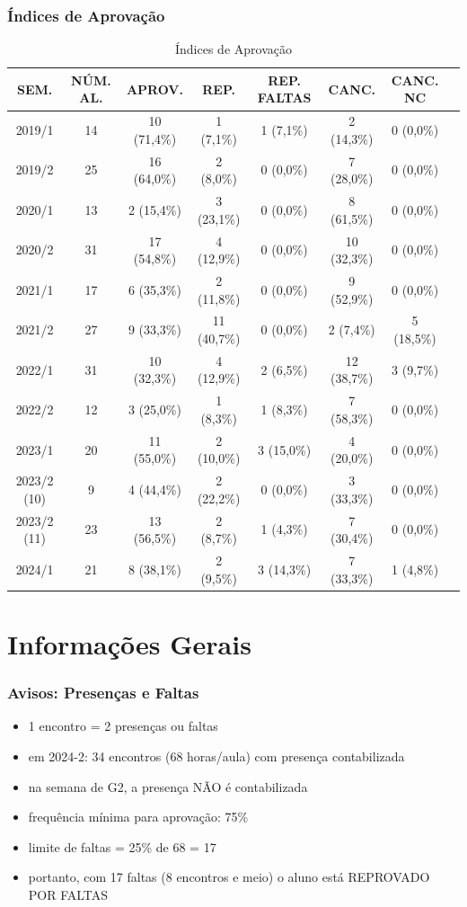 \documentclass[aspectratio=169]{beamer}
\begin{document}
\begin{frame}\frametitle{\'Indices de Aprova\c{c}\~ao}
	\begin{table}
		\centering
		\small
		\begin{tabular}{cccccccc}
			\toprule
			SEM. & N\'UM. AL. & APROV. & REP. & REP. FALTAS & CANC. & CANC. NC\\
			\midrule
			2019/1 & 14 & 10 (71,4\%) & 1 (7,1\%) & 1 (7,1\%) & 2 (14,3\%)& 0 (0,0\%)\\
			2019/2 & 25 & 16 (64,0\%) & 2 (8,0\%) & 0 (0,0\%) & 7 (28,0\%)& 0 (0,0\%)\\
			2020/1 & 13 & 2 (15,4\%) & 3 (23,1\%) & 0 (0,0\%) & 8 (61,5\%)& 0 (0,0\%)\\
			2020/2 & 31 & 17 (54,8\%) & 4 (12,9\%) & 0 (0,0\%) & 10 (32,3\%)& 0 (0,0\%)\\
			2021/1 & 17 & 6 (35,3\%) & 2 (11,8\%) & 0 (0,0\%) & 9 (52,9\%)& 0 (0,0\%)\\
			2021/2 & 27 & 9 (33,3\%) & 11 (40,7\%) & 0 (0,0\%) & 2 (7,4\%)& 5 (18,5\%)\\
			2022/1 & 31 & 10 (32,3\%) & 4 (12,9\%) & 2 (6,5\%) & 12 (38,7\%)& 3 (9,7\%)\\
			2022/2 & 12 & 3 (25,0\%) & 1 (8,3\%) & 1 (8,3\%) & 7 (58,3\%)& 0 (0,0\%)\\
			2023/1 & 20 & 11 (55,0\%) & 2 (10,0\%) & 3 (15,0\%) & 4 (20,0\%)& 0 (0,0\%)\\
			2023/2 (10) & 9 & 4 (44,4\%) & 2 (22,2\%) & 0 (0,0\%) & 3 (33,3\%) & 0 (0,0\%)\\
			2023/2 (11) & 23 & 13 (56,5\%) & 2 (8,7\%) & 1 (4,3\%) & 7 (30,4\%) & 0 (0,0\%)\\
			2024/1 & 21 & 8 (38,1\%) & 2 (9,5\%) & 3 (14,3\%) & 7 (33,3\%) & 1 (4,8\%)\\
			\bottomrule
		\end{tabular}
		\caption{\'Indices de Aprova\c{c}\~ao}
	\end{table}
\end{frame}

\section{Informa\c{c}\~oes Gerais}

\begin{frame}\frametitle{Avisos: Presenças e Faltas}
\begin{itemize}
	\item 1 encontro = 2 presen\c{c}as ou faltas
	\item em 2024-2: 34 encontros (68 horas/aula) com presença contabilizada
	\item na semana de G2, a presença NÃO é contabilizada
	\item frequ\^encia m\'inima para aprova\c{c}\~ao: 75\%
	\item limite de faltas = 25\% de 68 = 17
	\item portanto, com 17 faltas (8 encontros e meio) o aluno está REPROVADO POR FALTAS
\end{itemize}
\end{frame}
\end{document}
